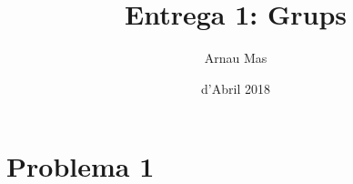 \documentclass[12pt]{article}
\title{\sffamily \bfseries{Entrega 1:} Grups}
\author{\sffamily Arnau Mas}
\date{\sffamily 24 d'Abril 2018}
\begin{document}
\maketitle

\section*{Problema 1}
\end{document}
